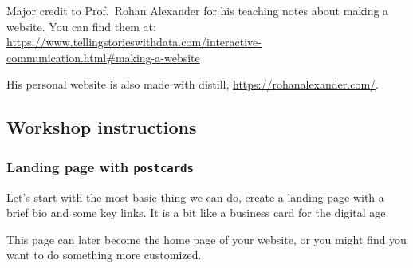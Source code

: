 \documentclass[
]{article}
\begin{document}
Major credit to Prof.~Rohan Alexander for his teaching notes about making a website. You can find them at: \url{https://www.tellingstorieswithdata.com/interactive-communication.html\#making-a-website}

His personal website is also made with distill, \url{https://rohanalexander.com/}.

\hypertarget{workshop-instructions}{%
\subsection{Workshop instructions}\label{workshop-instructions}}

\hypertarget{landing-page-with-postcards}{%
\subsubsection{\texorpdfstring{Landing page with \texttt{postcards}}{Landing page with postcards}}\label{landing-page-with-postcards}}

Let's start with the most basic thing we can do, create a landing page with a brief bio and some key links. It is a bit like a business card for the digital age.

This page can later become the home page of your website, or you might find you want to do something more customized.
\end{document}
